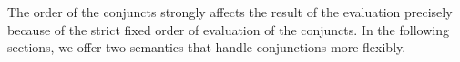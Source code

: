 The order of the conjuncts strongly affects the result of the evaluation precisely because of the strict fixed order of evaluation of the conjuncts. In the following sections, we offer two semantics that handle conjunctions more flexibly.